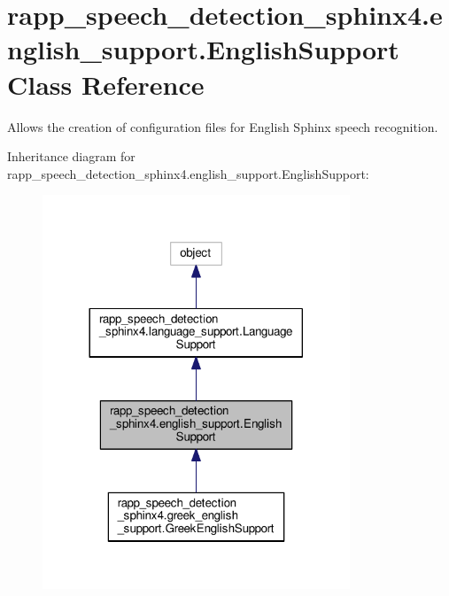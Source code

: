 \hypertarget{classrapp__speech__detection__sphinx4_1_1english__support_1_1EnglishSupport}{\section{rapp\-\_\-speech\-\_\-detection\-\_\-sphinx4.\-english\-\_\-support.\-English\-Support Class Reference}
\label{classrapp__speech__detection__sphinx4_1_1english__support_1_1EnglishSupport}
}


Allows the creation of configuration files for English Sphinx speech recognition.  




Inheritance diagram for rapp\-\_\-speech\-\_\-detection\-\_\-sphinx4.\-english\-\_\-support.\-English\-Support\-:
\nopagebreak
\begin{figure}[H]
\begin{center}
\leavevmode
\includegraphics[width=260pt]{classrapp__speech__detection__sphinx4_1_1english__support_1_1EnglishSupport__inherit__graph}
\end{center}
\end{figure}


